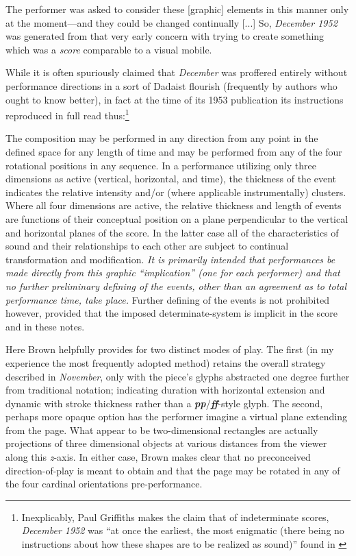    \begin{smallquote}
         The performer was asked to consider these [graphic] elements in this manner only at the moment---and they could be changed continually [...] So, \textit{December 1952} was generated from that very early concern with trying to create something which was a \textit{score} comparable to a visual mobile.\autocite{Brown_2008}
    \end{smallquote}

    While it is often spuriously claimed that \textit{December} was proffered entirely without performance directions in a sort of Dadaist flourish (frequently by authors who ought to know better), in fact at the time of its 1953 publication its instructions reproduced in full read thus:\footnote{Inexplicably, Paul Griffiths makes the claim that of indeterminate scores, \textit{December 1952} was ``at once the earliest, the most enigmatic (there being no instructions about how these shapes are to be realized as sound)'' found in \autocite{Griffiths_2011}}

        \begin{smallquote}
            The composition may be performed in any direction from any point in the defined space for any length of time and may be performed from any of the four rotational positions in any sequence. In a performance utilizing only three dimensions as active (vertical, horizontal, and time), the thickness of the event indicates the relative intensity and/or (where applicable instrumentally) clusters. Where all four dimensions are active, the relative thickness and length of events are functions of their conceptual position on a plane perpendicular to the vertical and horizontal planes of the score. In the latter case all of the characteristics of sound and their relationships to each other are subject to continual transformation and modification. \textit{It is primarily intended that performances be made directly from this graphic ``implication'' (one for each performer) and that no further preliminary defining of the events, other than an agreement as to total performance time, take place.} Further defining of the events is not prohibited however, provided that the imposed determinate-system is implicit in the score and in these notes.\autocite[1]{Brown_1986}
        \end{smallquote}

    Here Brown helpfully provides for two distinct modes of play. The first (in my experience the most frequently adopted method) retains the overall strategy described in \textit{November}, only with the piece's glyphs abstracted one degree further from traditional notation; indicating duration with horizontal extension and dynamic with stroke thickness rather than a \textbf{\textit{pp}}/\textbf{\textit{ff}}-style glyph. The second, perhaps more opaque option has the performer imagine a virtual plane extending from the page. What appear to be two-dimensional rectangles are actually projections of three dimensional objects at various distances from the viewer along this \textit{z}-axis. In either case, Brown makes clear that no preconceived direction-of-play is meant to obtain and that the page may be rotated in any of the four cardinal orientations pre-performance. 
    
